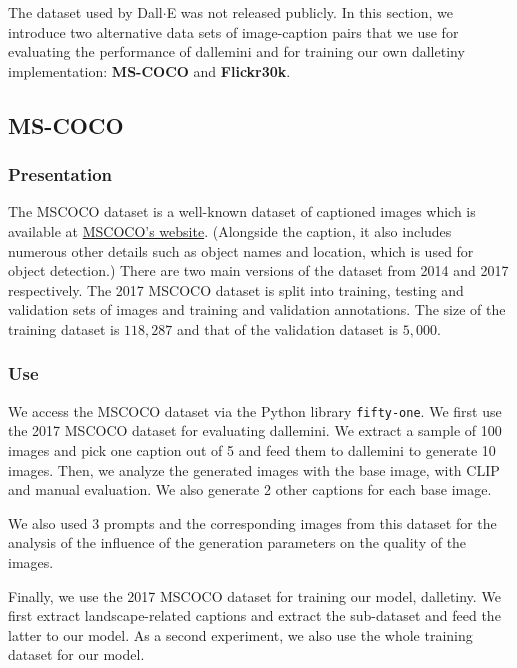 \documentclass{article}
\begin{document}
\begin{multicols}{2}
The dataset used by Dall$\cdot$E was not released publicly. In this section, we introduce two alternative data sets of image-caption pairs that we use for evaluating the performance of \gls{dallemini} and for training our own \gls{dalletiny} implementation: \textbf{MS-COCO} and \textbf{Flickr30k}.

\subsection{MS-COCO}

\subsubsection{Presentation}

The MSCOCO dataset is a well-known dataset of captioned images which is available at \href{https://cocodataset.org/}{MSCOCO's website}. (Alongside the caption, it also includes numerous other details such as object names and location, which is used for object detection.) There are two main versions of the dataset from 2014 and 2017 respectively. The 2017 MSCOCO dataset is split into training, testing and validation sets of images and training and validation annotations. The size of the training dataset is $118,287$ and that of the validation dataset is $5,000$.

\subsubsection{Use}

We access the MSCOCO dataset via the Python library \texttt{fifty-one}. 
We first use the 2017 MSCOCO dataset for evaluating \gls{dallemini}.
We extract a sample of 100 images and pick one caption out of 5 and feed them to \gls{dallemini} to generate 10 images.
Then, we analyze the generated images with the base image, with CLIP and manual evaluation.
We also generate 2 other captions for each base image.

We also used 3 prompts and the corresponding images from this dataset for the analysis of the influence of the generation parameters on the quality of the images.

Finally, we use the 2017 MSCOCO dataset for training our model, \gls{dalletiny}. We first extract landscape-related captions and extract the sub-dataset and feed the latter to our model.
As a second experiment, we also use the whole training dataset for our model.


\end{multicols}
\end{document}
